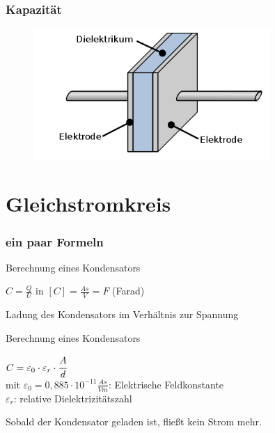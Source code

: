 \begin{frame}
  \frametitle{Kapazität}

  \begin{center}
    \begin{figure}
      \includegraphics[width=0.8\textwidth,height=.75\textheight,keepaspectratio]{e05/c-aufbau.png}
    \end{figure}
  \end{center}
\end{frame}

\section*{Gleich\-strom\-kreis}
\begin{frame}
  \frametitle{ein paar Formeln}
  \begin{block}{Berechnung eines Kondensators}
    \begin{center}
      \huge{$C = \frac{Q}{U}$} in $[C] = \frac{As}{V} = F$ (Farad)
    \end{center}
    Ladung des Kondensators im Verhältnis zur Spannung
  \end{block}
  \begin{block}{Berechnung eines Kondensators}
    \begin{center}
      \huge{$C= \varepsilon_{0} \cdot \varepsilon_{r} \cdot \cfrac{A}{d}$}\\
      \small{mit $\varepsilon_{0} = 0,885 \cdot 10^{-11} \frac{As}{Vm}$: Elektrische Feldkonstante\\
      $\varepsilon_{r}$: relative Dielektrizitätszahl}
    \end{center}
  \end{block}
  Sobald der Kondensator geladen ist, fließt kein Strom mehr.
\end{frame}

